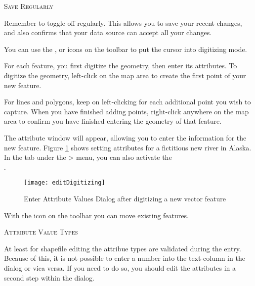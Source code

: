 \begin{Tip}\caption{\textsc{Save Regularly}}
Remember to toggle 
off regularly. This allows you to save your recent changes, and also confirms
that your data source can accept all your changes.
\end{Tip}


You can use the ,
 or
 icons on the toolbar to
put the \qg cursor into digitizing mode.

For each feature, you first digitize the geometry, then enter its attributes.
To digitize the geometry, left-click on the map area to create the first
point of your new feature.

For lines and polygons, keep on left-clicking for each additional
point you wish to capture.  When you have finished adding points,
right-click anywhere on the map area to confirm you have finished entering
the geometry of that feature.

The attribute window will appear, allowing you to enter the information for
the new feature. Figure \ref{fig:vector_digitising} shows setting attributes
for a fictitious new river in Alaska. In the  tab under the
 > menu, you can also activate the
\\
.

\begin{figure}[ht]
   \centering
   \texttt{[image: editDigitizing]}
   \caption{Enter Attribute Values Dialog after digitizing a new vector feature \nixcaption}\label{fig:vector_digitising}
 \end{figure}

With the  icon on the toolbar
you can move existing features.

\begin{Tip}\caption{\textsc{Attribute Value Types}}
At least for shapefile editing the attribue types are validated during the
entry. Because of this, it is not possible to enter a number into the text-column in
the dialog  or vica versa. If you need to do so,
you should edit the attributes in a second step within the  dialog.
\end{Tip}

